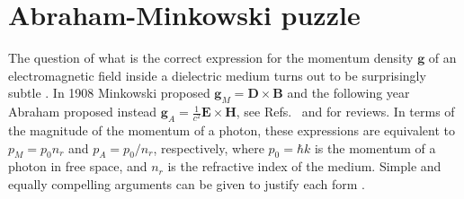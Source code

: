 \documentclass[twocolumn,english,pra,aps,superscriptaddress,floatfix]{revtex4-1}
\begin{document}


\section{Abraham-Minkowski puzzle}
\label{sec:AM}

The question of what is the correct expression for the momentum density $\mathbf{g}$ of an electromagnetic field inside a dielectric medium turns out to be surprisingly  subtle \cite{Peierls91}. In 1908 Minkowski proposed $\mathbf{g}_M=\mathbf{D} \times \mathbf{B}$ and the following year Abraham proposed instead $\mathbf{g}_A=\frac{1}{c^2} \mathbf{E} \times \mathbf{H}$, see Refs.\ \cite{Brevik} and \cite{pfeifer07}  for reviews. In terms of the magnitude of the momentum of a photon, these expressions are equivalent to $p_M= p_{0} n_{r}$ and $p_A=p_{0}/n_{r}$, respectively, where $p_0=\hbar k$ is the momentum of a photon in free space, and $n_r$ is the refractive index of the medium.  Simple and equally compelling arguments can be given to justify each form \cite{leonhardt06,loudon11}.
\end{document}
